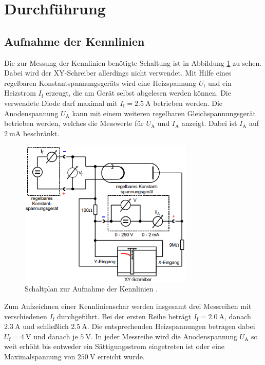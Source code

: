 \section{Durchführung}

\subsection{Aufnahme der Kennlinien}
Die zur Messung der Kennlinien benötigte Schaltung ist in Abbildung \ref{fig:schaltung_kennlinie} zu sehen.
Dabei wird der XY-Schreiber allerdings nicht verwendet.
Mit Hilfe eines regelbaren Konstantspannungsgeräts wird eine Heizspannung $U_\text{f}$ und ein Heizstrom $I_\text{f}$ erzeugt,
die am Gerät selbst abgelesen werden können.
Die verwendete Diode darf maximal mit $I_\text{f} = \qty[]{2.5}{\ampere}$ betrieben werden.
Die Anodenspannung $U_\text{A}$ kann mit einem weiteren regelbaren Gleichspannungsgerät betrieben werden, welches die Messwerte für 
$U_\text{A}$ und $I_\text{A}$ anzeigt.
Dabei ist $I_\text{A}$ auf $\qty[]{2}{\milli\ampere}$ beschränkt.

\begin{figure}
    \centering
    \includegraphics[height = 7cm]{Abbildungen/schaltung_kennlinie.png}
    \caption{Schaltplan zur Aufnahme der Kennlinien \cite[]{man:v504}.}
    \label{fig:schaltung_kennlinie}
\end{figure}

\noindent
Zum Aufzeichnen einer Kennlinienschar werden insgesamt drei Messreihen mit verschiedenen $I_\text{f}$ durchgeführt.
Bei der ersten Reihe beträgt $I_\text{f} = \qty[]{2.0}{\ampere}$, danach $\qty[]{2.3}{\ampere}$ und schließlich $\qty[]{2.5}{\ampere}$.
Die entsprechenden Heizspannungen betragen dabei $U_\text{f} = \qty[]{4}{\volt}$ und danach je $\qty[]{5}{\volt}$.
In jeder Messreihe wird die Anodenspannung $U_\text{A}$ so weit erhöht bis entweder ein Sättigungsstrom eingetreten ist oder
eine Maximalspannung von $\qty[]{250}{\volt}$ erreicht wurde.



